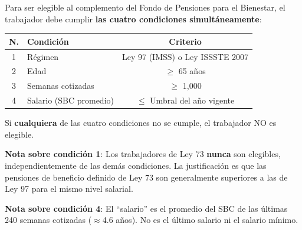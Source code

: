 \documentclass[11pt,a4paper]{report}
\begin{document}
\begin{tcolorbox}[colback=blue!5!white, colframe=blue!75!black, title=\textbf{Definici\'on Formal}]
Para ser elegible al complemento del Fondo de Pensiones para el Bienestar, el trabajador debe cumplir \textbf{las cuatro condiciones simult\'aneamente}:

\begin{center}
\begin{tabular}{clc}
\toprule
\textbf{N.} & \textbf{Condici\'on} & \textbf{Criterio} \\
\midrule
1 & R\'egimen & Ley 97 (IMSS) o Ley ISSSTE 2007 \\
2 & Edad & $\geq$ 65 a\~nos \\
3 & Semanas cotizadas & $\geq$ 1,000 \\
4 & Salario (SBC promedio) & $\leq$ Umbral del a\~no vigente \\
\bottomrule
\end{tabular}
\end{center}

Si \textbf{cualquiera} de las cuatro condiciones no se cumple, el trabajador NO es elegible.

\textbf{Nota sobre condici\'on 1}: Los trabajadores de Ley 73 \textbf{nunca} son elegibles, independientemente de las dem\'as condiciones. La justificaci\'on es que las pensiones de beneficio definido de Ley 73 son generalmente superiores a las de Ley 97 para el mismo nivel salarial.

\textbf{Nota sobre condici\'on 4}: El ``salario'' es el promedio del SBC de las \'ultimas 240 semanas cotizadas ($\approx$4.6 a\~nos). No es el \'ultimo salario ni el salario m\'inimo.
\end{tcolorbox}
\end{document}
